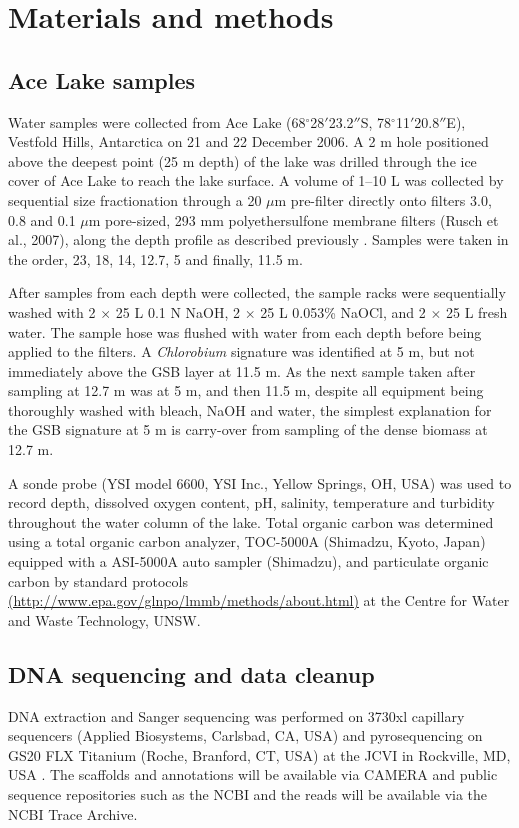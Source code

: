
\section{Materials and methods}
\label{ch:mm}
\subsection{Ace Lake samples}
Water samples were collected from Ace Lake (68$^{\circ}$28$'$23.2$''$S, 78$^{\circ}$11$'$20.8$''$E), Vestfold Hills, Antarctica on 21 and 22 December 2006. 
A 2 m hole positioned above the deepest point (25 m depth) of the lake was drilled through the ice cover of Ace Lake to reach the lake surface.
A volume of 1--10 L was collected by sequential size fractionation through a 20 $\mu$m pre-filter directly onto filters 3.0, 0.8 and 0.1 $\mu$m pore-sized, 293 mm polyethersulfone membrane filters (Rusch et al., 2007), along the depth profile as described previously \cite{Ng2010a}.
Samples were taken in the order, 23, 18, 14, 12.7, 5 and finally, 11.5 m.

After samples from each depth were collected, the sample racks were sequentially washed with 2 $\times$ 25 L 0.1 N NaOH, 2 $\times$ 25 L 0.053\% NaOCl, and 2 $\times$ 25 L fresh water. 
The sample hose was flushed with water from each depth before being applied to the filters. 
A \emph{Chlorobium} signature was identified at 5 m, but not immediately above the \ac{GSB} layer at 11.5 m. 
As the next sample taken after sampling at 12.7 m was at 5 m, and then 11.5 m, despite all equipment being thoroughly washed with bleach, NaOH and water, 
the simplest explanation for the \ac{GSB} signature at 5 m is carry-over from sampling of the dense biomass at 12.7 m. 

A sonde probe (YSI model 6600, YSI Inc., Yellow Springs, OH, USA) was used to record depth, dissolved oxygen content, pH, salinity, temperature and turbidity throughout the water column of the lake. 
Total organic carbon was determined using a total organic carbon analyzer, TOC-5000A (Shimadzu, Kyoto, Japan) equipped with a ASI-5000A auto sampler (Shimadzu), and particulate organic carbon by standard protocols 
\url{(http://www.epa.gov/glnpo/lmmb/methods/about.html)} 
at the Centre for Water and Waste Technology, UNSW.

\subsection{DNA sequencing and data cleanup}
DNA extraction and Sanger sequencing was performed on 3730xl capillary sequencers (Applied Biosystems, Carlsbad, CA, USA) and pyrosequencing on GS20 FLX Titanium (Roche, Branford, CT, USA) at the \acl{JCVI} in Rockville, MD, USA \cite{Rusch2007}. 
The scaffolds and annotations will be available via \ac{CAMERA} and public sequence repositories such as the \ac{NCBI} and the reads will be available via the \ac{NCBI} Trace Archive. 

